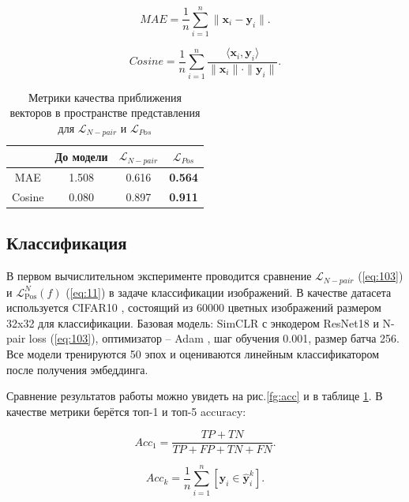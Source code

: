 \documentclass[a4paper, 14pt]{article}
\begin{document}
\[MAE = \frac{1}{n} \sum\limits_{i = 1}^n\|\mathbf{x}_i - \mathbf{y}_i\|.\]

\[Cosine = \frac{1}{n} \sum\limits_{i = 1}^n\frac{\langle \mathbf{x}_i, \mathbf{y}_i \rangle}{\|\mathbf{x}_i\| \cdot \|\mathbf{y}_i\|}.\]

\begin{table}[!ht]
\begin{center}
\caption{Метрики качества приближения векторов в пространстве представления для $\mathcal{L}_{N-pair}$ и $\mathcal{L}_{Pos}$}
\begin{tabular}{| c | c | c | c |}
\hline
& До модели & $\mathcal{L}_{N-pair}$ & $\mathcal{L}_{Pos}$ \\ \hline
MAE & 1.508 & 0.616 & \textbf{0.564} \\ \hline
Cosine & 0.080 & 0.897 & \textbf{0.911} \\ \hline
\end{tabular}
\label{res_classification}
\end{center}
\end{table}

\subsection{Классификация}
В первом вычислительном эксперименте проводится сравнение $\mathcal{L}_{N-pair}$ (\ref{eq:103}) и $\mathcal{L}_{\text{Pos}}^N(f)$ (\ref{eq:11}) в задаче классификации изображений. В качестве датасета используется CIFAR10 \citep{krizhevsky2009learning}, состоящий из 60000 цветных изображений размером 32x32 для классификации. Базовая модель: SimCLR \citep{chuang2020debiased} с энкодером ResNet18 \citep{he2015deep} и N-pair loss (\ref{eq:103}), оптимизатор -- Adam \citep{kingma2017adam}, шаг обучения 0.001, размер батча 256. Все модели тренируются 50 эпох и оцениваются линейным классификатором после получения эмбеддинга.

Сравнение результатов работы можно увидеть на рис.\ref{fg:acc} и в таблице \ref{res_classification}. В качестве метрики берётся топ-1 и топ-5 accuracy:

\[Acc_1 = \frac{TP + TN}{TP + FP + TN + FN}.\]

\[Acc_k = \frac{1}{n}\sum\limits_{i=1}^n[\mathbf{y}_i \in \hat{\mathbf{y}}_i^k].\]
\end{document}

